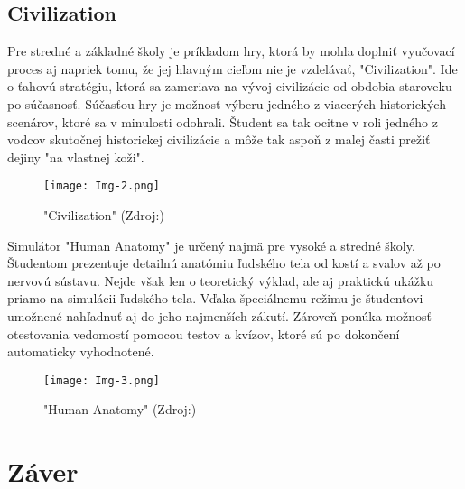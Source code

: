 \documentclass[10pt,twoside,slovak,a4paper]{article}
\begin{document}
\subsection{Civilization} \label{hra-2}

Pre stredné a základné školy je príkladom hry, ktorá by mohla doplniť vyučovací proces aj napriek tomu, že jej hlavným cieľom nie je vzdelávať, "Civilization"\cite{Civil}. Ide o ťahovú stratégiu, ktorá sa zameriava na vývoj civilizácie od obdobia staroveku po súčasnosť. Súčasťou hry je možnosť výberu jedného z viacerých historických scenárov, ktoré sa v minulosti odohrali. Študent sa tak ocitne v roli jedného z vodcov skutočnej historickej civilizácie a môže tak aspoň z malej časti prežiť dejiny "na vlastnej koži".

\begin{figure}[tbh]
	\centering
	\texttt{[image: Img-2.png]}
	\caption{"Civilization" (Zdroj:\cite{Img-Civil})}
	\label{obr-2}
\end{figure}

Simulátor "Human Anatomy"\cite{Antom} je určený najmä pre vysoké a stredné školy. Študentom prezentuje detailnú anatómiu ľudského tela od kostí a svalov až po nervovú sústavu. Nejde však len o teoretický výklad, ale aj praktickú ukážku priamo na simulácii ľudského tela. Vďaka špeciálnemu režimu je študentovi umožnené nahľadnuť aj do jeho najmenších zákutí. Zároveň ponúka možnosť otestovania vedomostí pomocou testov a kvízov, ktoré sú po dokončení automaticky vyhodnotené.

\begin{figure}[tbh]
	\centering
	\texttt{[image: Img-3.png]}
	\caption{"Human Anatomy" (Zdroj:\cite{Img-Antom})}
	\label{obr-3}
\end{figure}

\section{Záver}



\end{document}
